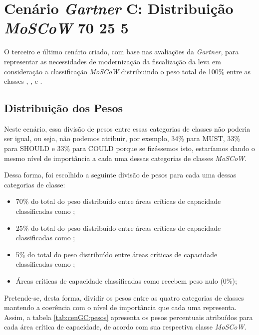 \newcommand{\cenGC}{Cenário \emph{Gartner} C: Distribuição \emph{MoSCoW} 70 25 5} 
\section{\cenGC}
\label{sec-cengc}

    O terceiro e último cenário criado, com base nas avaliações da \emph{Gartner}, para representar as necessidades de modernização da fiscalização da \CLDF leva em consideração a classificação \emph{MoSCoW} distribuindo o peso total de 100\% entre as classes \MUST, \SHOULD, \COULD e \WOULD. 
    

\subsection*{Distribuição dos Pesos}    
\label{sub-cengc-pesos}

    Neste cenário, essa divisão de pesos entre essas categorias de classes não poderia ser igual, ou seja, não podemos atribuir, por exemplo, 34\%  para MUST, 33\% para SHOULD e 33\% para COULD porque se fizéssemos isto, estaríamos dando o mesmo nível de importância a cada uma dessas categorias de classes \emph{MoSCoW}.
    
    Dessa forma, foi escolhido a seguinte divisão de pesos para cada uma dessas categorias de classe:
    
    \begin{itemize}
        \item 70\% do total do peso distribuído entre áreas críticas de capacidade classificadas como \MUST;
        \item 25\% do total do peso distribuído entre áreas críticas de capacidade classificadas como \SHOULD;
        \item 5\% do total do peso distribuído entre áreas críticas de capacidade classificadas como \COULD;
        \item Áreas críticas de capacidade classificadas como \WOULD recebem peso nulo (0\%);
    \end{itemize}
    
    Pretende-se, desta forma, dividir os pesos entre as quatro categorias de classes mantendo a coerência com o nível de importância que cada uma representa. Assim, a tabela \ref{tab:cenGC:pesos} apresenta os pesos percentuais atribuídos para cada área crítica de capacidade, de acordo com sua respectiva classe \emph{MoSCoW}.

